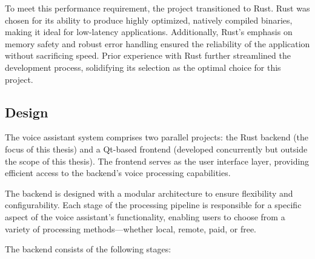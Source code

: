 To meet this performance requirement, the project transitioned to Rust.
Rust was chosen for its ability to produce highly optimized, natively compiled binaries,
making it ideal for low-latency applications.
Additionally, Rust's emphasis on memory safety and robust error handling
ensured the reliability of the application without sacrificing speed.
Prior experience with Rust further streamlined the development process,
solidifying its selection as the optimal choice for this project.

\subsection{Design}
The voice assistant system comprises two parallel projects:
the Rust backend (the focus of this thesis) and a Qt-based frontend
(developed concurrently but outside the scope of this thesis).
The frontend serves as the user interface layer,
providing efficient access to the backend's voice processing capabilities.

The backend is designed with a modular architecture to ensure flexibility and configurability.
Each stage of the processing pipeline is responsible for a specific aspect of the voice assistant's functionality,
enabling users to choose from a variety of processing methods—whether local, remote, paid, or free.

The backend consists of the following stages:


